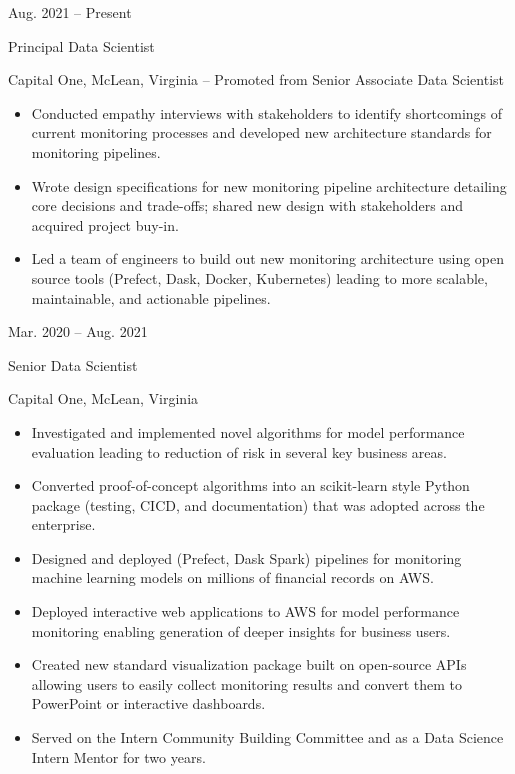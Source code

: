 \documentclass[10pt]{article}
\newlength{\cvcolumngapwidth}
\newlength{\cvleftcolumnwidth}
\newlength{\cvrightcolumnwidth}
\newcommand{\cvtitlestyle}[1]{{\large\cvtitlefont\textcolor{cvtitlecolor}{#1}}}
\newcommand{\cvdurationstyle}[1]{{\small\cvdurationfont\textcolor{cvdurationcolor}{#1}}}
\newlength{\cvafteritemskipamount}
\newlength{\cvparskip}
\newcommand{\cvitem}[2]{
    \begin{minipage}[t]{\cvleftcolumnwidth}
        \raggedleft #1
    \end{minipage}%
    \hspace{\cvcolumngapwidth}%
    \begin{minipage}[t]{\cvrightcolumnwidth}
        \setlength{\parskip}{\cvparskip} #2
    \end{minipage}

    \vspace{\cvafteritemskipamount}
}
\newcommand{\cvtitle}[1]{
    \cvtitlestyle{#1}

    \vspace{1mm plus 0.25mm minus 0.25mm}
    \vspace{-\cvparskip}
}
\begin{document}
\cvitem{
    \cvdurationstyle{Aug. 2021 -- Present}
}{
    \cvtitle{Principal Data Scientist}

    Capital One, McLean, Virginia -- Promoted from Senior Associate Data Scientist 

    \begin{itemize}[leftmargin=*]
        \item Conducted empathy interviews with stakeholders to identify shortcomings of current monitoring processes and developed new architecture standards for monitoring pipelines.
        \item Wrote design specifications for new monitoring pipeline architecture detailing core decisions and trade-offs; shared new design with stakeholders and acquired project buy-in. 
        \item Led a team of engineers to build out new monitoring architecture using open source tools (Prefect, Dask, Docker, Kubernetes) leading to more scalable, maintainable, and actionable pipelines.
    \end{itemize}
}

\cvitem{
    \cvdurationstyle{Mar. 2020 -- Aug. 2021}
}{
    \cvtitle{Senior Data Scientist}

    Capital One, McLean, Virginia

    \begin{itemize}[leftmargin=*]
        \item Investigated and implemented novel algorithms for model performance evaluation leading to reduction of risk in several key business areas.
        \item Converted proof-of-concept algorithms into an scikit-learn style Python package (testing, CICD, and documentation) that was adopted across the enterprise. 
        \item Designed and deployed (Prefect, Dask Spark) pipelines for monitoring machine learning models on millions of financial records on AWS.
        \item Deployed interactive web applications to AWS for model performance monitoring enabling generation of deeper insights for business users.
        \item Created new standard visualization package built on open-source APIs allowing users to easily collect monitoring results and convert them to PowerPoint or interactive dashboards.
        \item Served on the Intern Community Building Committee and as a Data Science Intern Mentor for two years.
    \end{itemize}
}
\end{document}
